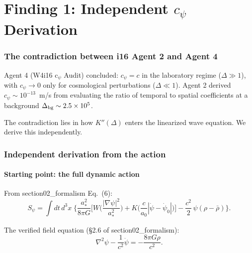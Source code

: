 \documentclass[11pt]{article}
\newcommand{\ee}[1]{\times 10^{#1}}
\begin{document}
\newpage

\part{Finding 1: Independent $c_\psi$ Derivation}
\label{part:cpsi}

\section{The contradiction between i16 Agent 2 and Agent 4}

Agent 4 (W4i16 c$_\psi$ Audit) concluded: $c_\psi = c$ in the laboratory
regime ($\Delta \gg 1$), with $c_\psi \to 0$ only for cosmological
perturbations ($\Delta \ll 1$). Agent 2 derived $c_\psi \sim 10^{-13}$~m/s
from evaluating the ratio of temporal to spatial coefficients at a
background $\Delta_{\rm bg} \sim 2.5\ee{5}$.

The contradiction lies in how $K''(\Delta)$ enters the linearized
wave equation. We derive this independently.

\section{Independent derivation from the action}

\subsection{Starting point: the full dynamic action}

From section02\_formalism Eq.~(6):
\begin{equation}
S_\psi = \int dt\,d^3x\;\Biggl\{
  \frac{a_*^2}{8\pi G}\biggl[
    W\!\biggl(\frac{|\nabla\psi|^2}{a_*^2}\biggr)
    + K\!\biggl(\frac{c}{a_0}|\dot\psi{-}\dot\psi_0|\biggr)
  \biggr]
  - \frac{c^2}{2}\,\psi(\rho - \bar\rho)
\Biggr\}.
\label{eq:full-action}
\end{equation}

The verified field equation (\S2.6 of section02\_formalism):
\begin{equation}
\nabla^2\psi - \frac{1}{c^2}\ddot\psi = -\frac{8\pi G\rho}{c^2}.
\label{eq:verification}
\end{equation}
\end{document}
